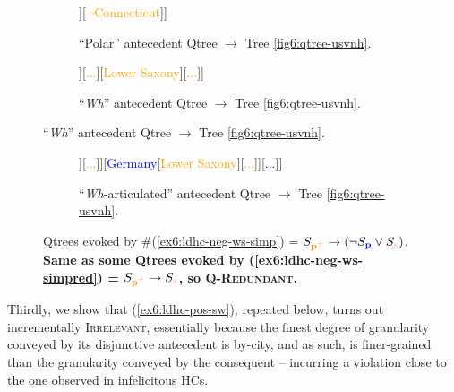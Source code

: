 \begin{figure}[H]
	\centering
	\begin{subfigure}[b]{.45\linewidth}
		\centering
		\begin{forest}
			[CS[{\textcolor{orange}{Connecticut}}[\fbox{\textcolor{pink}{New Haven}}][\textcolor{pink}{...}]][{\textcolor{orange}{$\neg$Connecticut}}]]
		\end{forest}
		\caption{``Polar'' antecedent Qtree $\rightarrow$ Tree \ref{fig6:qtree-usvnh}.}
	\end{subfigure}
	\hfill
	\begin{subfigure}[b]{.45\linewidth}
		\centering
		\begin{forest}
			[CS[{\textcolor{orange}{Connecticut}}[\fbox{\textcolor{pink}{New Haven}}][\textcolor{pink}{...}]][{\textcolor{orange}{...}}][{\textcolor{orange}{Lower Saxony}}][{\textcolor{orange}{...}}]]
		\end{forest}
		\caption{``\textit{Wh}'' antecedent Qtree $\rightarrow$ Tree \ref{fig6:qtree-usvnh}.}
	\end{subfigure}
\end{figure}
\begin{figure}[H]
	\ContinuedFloat
	\centering
	\begin{subfigure}[b]{.45\linewidth}
		\centering
		\begin{forest}
			[CS[\textcolor{blue}{US}[{\textcolor{orange}{Connecticut}}[\fbox{\textcolor{pink}{New Haven}}][\textcolor{pink}{...}]][\textcolor{orange}{...}]][{\textcolor{blue}{Germany}}[\textcolor{orange}{Lower Saxony}][\textcolor{orange}{...}]][{\textcolor{blue}{...}}]]
		\end{forest}
		\caption{``\textit{Wh}-articulated'' antecedent Qtree $\rightarrow$ Tree \ref{fig6:qtree-usvnh}.}
	\end{subfigure}
	\caption[]{Qtrees evoked by \#(\ref{ex6:ldhc-neg-ws-simp}) = $S_{\pplus} \rightarrow (\neg S_{\p} \vee S_{\s})$.\\\textbf{Same as some Qtrees evoked by (\ref{ex6:ldhc-neg-ws-simpred}) = $S_{\pplus} \rightarrow S_{\s}$, so \textsc{Q-Redundant}.}}\label{fig6:qtree-ctt(usvnh)}
\end{figure}

Thirdly, we show that (\ref{ex6:ldhc-pos-sw}), repeated below, turns out incrementally \textsc{Irrelevant}, essentially because the finest degree of granularity conveyed by its disjunctive antecedent is by-city, and as such, is finer-grained than the granularity conveyed by the consequent -- incurring a violation close to the one observed in infelicitous HCs.

